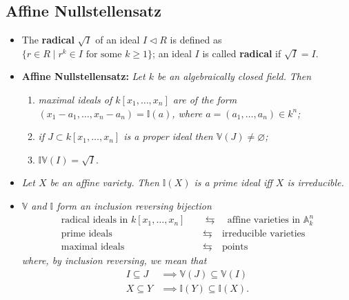 \documentclass[10pt]{article}
\newcommand{\van}{\mathbb{V}}
\newcommand{\ide}{\mathbb{I}}
\newcommand{\aff}{\mathbb{A}}
\newcommand{\kon}{{k[x_1,\ldots,x_n]}}
\begin{document}
        \subsection{Affine Nullstellensatz}

            \begin{itemize}
                \item The \textbf{radical} $\sqrt{I}$ of an ideal $I\triangleleft R$ is defined as $\{r\in R\mid r^k\in I\text{ for some }k\geqslant1\}$; an ideal $I$ is called \textbf{radical} if $\sqrt{I}=I$.
                \item \textbf{Affine Nullstellensatz:} \emph{Let $k$ be an algebraically closed field.}
                    \emph{Then}
                    \begin{enumerate}
                        \item \emph{maximal ideals of $\kon$ are of the form $(x_1-a_1,\ldots,x_n-a_n)=\ide(a)$, where $a=(a_1,\ldots,a_n)\in k^n$;}
                        \item \emph{if $J\subset\kon$ is a proper ideal then $\van(J)\neq\varnothing$;}
                        \item $\ide\van(I)=\sqrt{I}$.
                    \end{enumerate}
                \item \emph{Let $X$ be an affine variety.}
                    \emph{Then $\ide(X)$ is a prime ideal iff $X$ is irreducible.}
                \item \emph{$\van$ and $\ide$ form an inclusion reversing bijection}
                    \begin{align*}
                        \text{radical ideals in }\kon\quad&\leftrightarrows\quad\text{affine varieties in }\aff_k^n\\
                        \text{prime ideals} \quad&\leftrightarrows\quad \text{irreducible varieties}\\
                        \text{maximal ideals} \quad&\leftrightarrows\quad \text{points}
                    \end{align*}
                    \emph{where, by inclusion reversing, we mean that}
                    \begin{align*}
                        I\subseteq J&\implies\van(J)\subseteq\van(I)\\
                        X\subseteq Y&\implies\ide(Y)\subseteq\ide(X).
                    \end{align*}

            \end{itemize}
\end{document}
